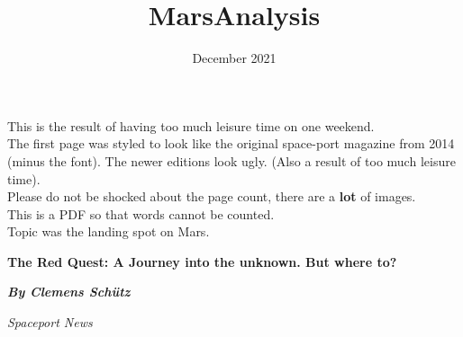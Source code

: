\documentclass{article}
\title{MarsAnalysis}
\date{December 2021}
\begin{document}
{
    \noindent
    \begin{center}
        \vspace*{\fill}
        This is the result of having too much leisure time on one weekend.\\
        The first page was styled to look like the original space-port magazine from 2014 (minus the font). The newer editions look ugly.
        (Also a result of too much leisure time).\\
        Please do not be shocked about the page count, there are a \textbf{lot} of images.\\
        This is a PDF so that words cannot be counted. \\
        Topic was the landing spot on Mars.
        \vspace*{\fill}
    \end{center}
}
\pagebreak


\noindent
{\fontsize{40pt}{42pt}
    \selectfont \noindent \textbf{The Red Quest: A Journey into the unknown. But where to?}
}

\vspace{\baselineskip} %

\noindent %
\textbf{\emph{By Clemens Schütz}} %

\noindent %
\emph{Spaceport News}
\end{document}
